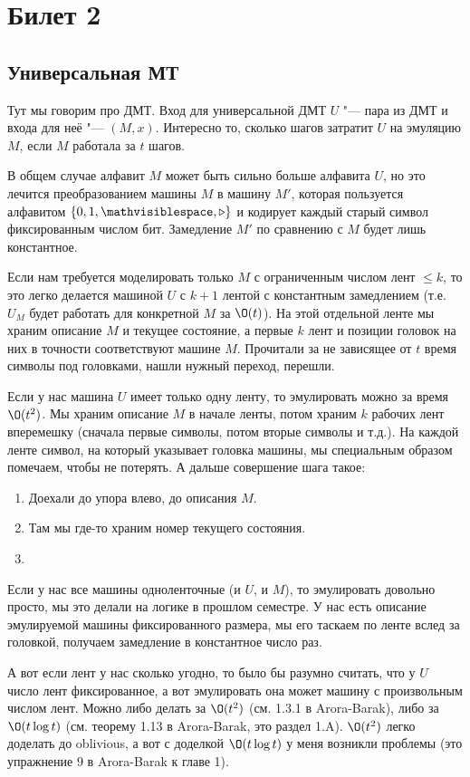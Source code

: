 \setcounter{section}{1}
\section{Билет 2}

\subsection{Универсальная МТ}
	Тут мы говорим про ДМТ.
	Вход для универсальной ДМТ $U$ "--- пара из ДМТ и входа для неё "--- $(M, x)$.
	Интересно то, сколько шагов затратит $U$ на эмуляцию $M$, если $M$ работала за $t$ шагов.

	\begin{Rem}
		В общем случае алфавит $M$ может быть сильно больше алфавита $U$, но это лечится преобразованием машины $M$
		в машину $M'$, которая пользуется алфавитом $\{0, 1, \mathvisiblespace, \triangleright\}$ и кодирует каждый старый символ
		фиксированным числом бит.
		Замедление $M'$ по сравнению с $M$ будет лишь константное.
	\end{Rem}
	
	Если нам требуется моделировать только $M$ с ограниченным числом лент $\le k$, то
	это легко делается машиной $U$ с $k+1$ лентой с константным замедлением (т.е. $U_M$ будет работать для конкретной $M$ за $\O(t)$).
	На этой отдельной ленте мы храним описание $M$ и текущее состояние, а первые $k$ лент и позиции головок на них в точности соответствуют машине $M$.
	Прочитали за не зависящее от $t$ время символы под головками, нашли нужный переход, перешли.

	Если у нас машина $U$ имеет только одну ленту, то эмулировать можно за время $\O(t^2)$.
	Мы храним описание $M$ в начале ленты, потом храним $k$ рабочих лент вперемешку (сначала первые символы, потом вторые символы и т.д.).
	На каждой ленте символ, на который указывает головка машины, мы специальным образом помечаем, чтобы не потерять.
	А дальше совершение шага такое:
	\begin{enumerate}
		\item Доехали до упора влево, до описания $M$.
		\item Там мы где-то храним номер текущего состояния.
		\item \TODO
	\end{enumerate}
	
	Если у нас все машины одноленточные (и $U$, и $M$), то эмулировать довольно просто, мы это делали на логике в прошлом семестре.
	У нас есть описание эмулируемой машины фиксированного размера, мы его таскаем по ленте вслед за головкой, получаем замедление в константное число раз.

	А вот если лент у нас сколько угодно, то было бы разумно считать, что у $U$ число лент фиксированное, а вот эмулировать она может машину с произвольным числом лент.
	Можно либо делать за $\O(t^2)$ (см. 1.3.1 в Arora-Barak), либо за $\O(t \log t)$ (см. теорему 1.13 в Arora-Barak, это раздел 1.A).
	$\O(t^2)$ легко доделать до oblivious, а вот с доделкой $\O(t \log t)$ у меня возникли проблемы (это упражнение 9 в Arora-Barak к главе 1).
	\TODO
